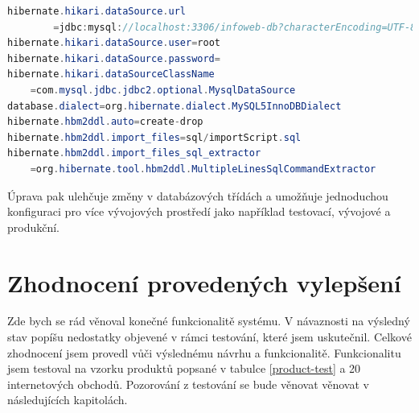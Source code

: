\documentclass[thesis=B,czech]{FITthesis}[2012/06/26]
\begin{document}
\begin{lstlisting}[language=Java, caption={Nastavení připojení do databáze.}]
hibernate.hikari.dataSource.url
		=jdbc:mysql://localhost:3306/infoweb-db?characterEncoding=UTF-8
hibernate.hikari.dataSource.user=root
hibernate.hikari.dataSource.password=
hibernate.hikari.dataSourceClassName
	=com.mysql.jdbc.jdbc2.optional.MysqlDataSource
database.dialect=org.hibernate.dialect.MySQL5InnoDBDialect
hibernate.hbm2ddl.auto=create-drop
hibernate.hbm2ddl.import_files=sql/importScript.sql
hibernate.hbm2ddl.import_files_sql_extractor
	=org.hibernate.tool.hbm2ddl.MultipleLinesSqlCommandExtractor
\end{lstlisting}

Úprava pak ulehčuje změny v databázových třídách a umožňuje jednoduchou konfiguraci pro více vývojových prostředí jako například testovací, vývojové
a produkční.


\chapter{Zhodnocení provedených vylepšení}
Zde bych se rád věnoval konečné funkcionalitě systému. V návaznosti na výsledný stav popíšu nedostatky objevené v rámci testování, které jsem uskutečnil. Celkové zhodnocení jsem provedl vůči výslednému návrhu a funkcionalitě. Funkcionalitu jsem 
testoval na vzorku produktů popsané v tabulce \ref{product-test} a 20 internetových obchodů.
Pozorování z testování se bude věnovat věnovat v následujících kapitolách.
\end{document}

